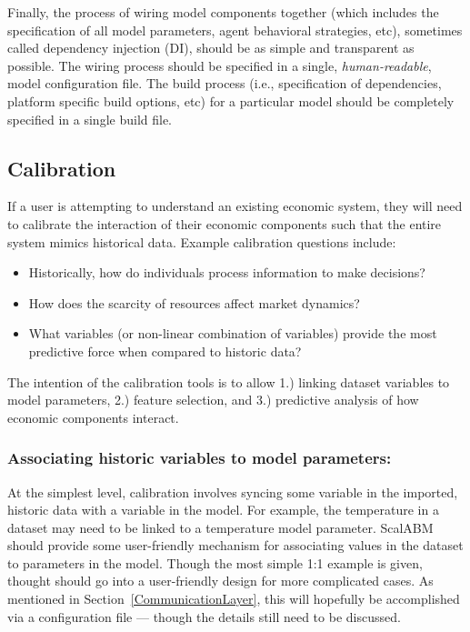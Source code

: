 \documentclass[a4paper]{article}
\begin{document}
Finally, the process of wiring model components together (which includes the specification of all model parameters, agent behavioral strategies, etc), sometimes called dependency injection (DI), should be as simple and transparent as possible. The wiring process should be specified in a single, \textit{human-readable}, model configuration file. The build process (i.e., specification of dependencies, platform specific build options, etc) for a particular model should be completely specified in a single build file.

\subsection{Calibration}
\label{Calibration}

If a user is attempting to understand an existing economic system, they will need to calibrate the interaction of their economic components such that the entire system mimics historical data. Example calibration questions include:

\begin{itemize}
    \item Historically, how do individuals process information to make decisions?
    \item How does the scarcity of resources affect market dynamics? 
	\item What variables (or non-linear combination of variables) provide the most predictive force when compared to historic data?
    \end{itemize}

The intention of the calibration tools is to allow 1.) linking dataset variables to model parameters, 2.) feature selection, and 3.) predictive analysis of how economic components interact.

\subsubsection{Associating historic variables to model parameters:}

At the simplest level, calibration involves syncing some variable in the imported, historic data with a variable in the model. For example, the temperature in a dataset may need to be linked to a temperature model parameter. ScalABM should provide some user-friendly mechanism for associating values in the dataset to parameters in the model. Though the most simple 1:1 example is given, thought should go into a user-friendly design for more complicated cases. As mentioned in Section~\ref{CommunicationLayer}, this will hopefully be accomplished via a configuration file --- though the details still need to be discussed.
\end{document}
